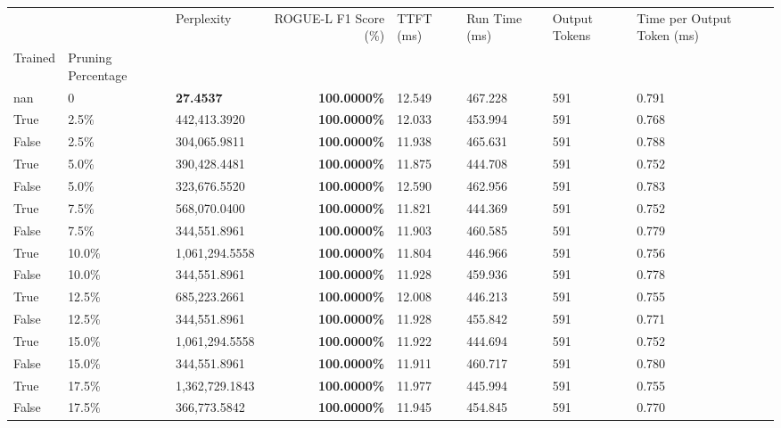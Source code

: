 \begin{table}[H]
\label{tab:evaluation-pipeline-4}
\begin{tabular}{lllrllll}
\toprule
 &  & Perplexity & ROGUE-L F1 Score (\%) & TTFT (ms) & Run Time (ms) & Output Tokens & Time per Output Token (ms) \\
Trained & Pruning Percentage &  &  &  &  &  &  \\
\midrule
nan & 0 & \bfseries 27.4537 & \bfseries 100.0000\% & 12.549 & 467.228 & 591 & 0.791 \\
\cline{1-8}
True & 2.5\% & 442,413.3920 & \bfseries \color{red} 100.0000\% & 12.033 & 453.994 & 591 & 0.768 \\
\cline{1-8}
False & 2.5\% & 304,065.9811 & \bfseries \color{red} 100.0000\% & 11.938 & 465.631 & 591 & 0.788 \\
\cline{1-8}
True & 5.0\% & 390,428.4481 & \bfseries \color{red} 100.0000\% & 11.875 & 444.708 & 591 & 0.752 \\
\cline{1-8}
False & 5.0\% & 323,676.5520 & \bfseries \color{red} 100.0000\% & 12.590 & 462.956 & 591 & 0.783 \\
\cline{1-8}
True & 7.5\% & 568,070.0400 & \bfseries \color{red} 100.0000\% & 11.821 & 444.369 & 591 & 0.752 \\
\cline{1-8}
False & 7.5\% & 344,551.8961 & \bfseries \color{red} 100.0000\% & 11.903 & 460.585 & 591 & 0.779 \\
\cline{1-8}
True & 10.0\% & 1,061,294.5558 & \bfseries \color{red} 100.0000\% & 11.804 & 446.966 & 591 & 0.756 \\
\cline{1-8}
False & 10.0\% & 344,551.8961 & \bfseries \color{red} 100.0000\% & 11.928 & 459.936 & 591 & 0.778 \\
\cline{1-8}
True & 12.5\% & 685,223.2661 & \bfseries \color{red} 100.0000\% & 12.008 & 446.213 & 591 & 0.755 \\
\cline{1-8}
False & 12.5\% & 344,551.8961 & \bfseries \color{red} 100.0000\% & 11.928 & 455.842 & 591 & 0.771 \\
\cline{1-8}
True & 15.0\% & 1,061,294.5558 & \bfseries \color{red} 100.0000\% & 11.922 & 444.694 & 591 & 0.752 \\
\cline{1-8}
False & 15.0\% & 344,551.8961 & \bfseries \color{red} 100.0000\% & 11.911 & 460.717 & 591 & 0.780 \\
\cline{1-8}
True & 17.5\% & 1,362,729.1843 & \bfseries \color{red} 100.0000\% & 11.977 & 445.994 & 591 & 0.755 \\
\cline{1-8}
False & 17.5\% & 366,773.5842 & \bfseries \color{red} 100.0000\% & 11.945 & 454.845 & 591 & 0.770 \\

\end{tabular}
\end{table}
